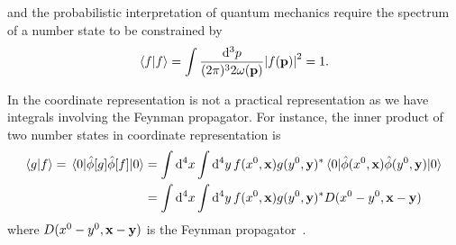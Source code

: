 \begin{corollary}
	 and the probabilistic interpretation of quantum mechanics require the spectrum of a number state to be constrained by
	\begin{equation}
		\bra{f}\ket{f}
		=
		\int\frac{\dd[3]{p}}{(2\pi)^32\omega(\vb{p})}
		\abs{f(\vb{p})}^2
		=
		1
		.
	\end{equation}
\end{corollary}

\begin{remark}
	In the coordinate representation is not a practical representation as we have integrals involving the Feynman propagator.
	For instance, the inner product of two number states in coordinate representation is
	\begin{equation}
		\begin{split}
			\bra{g}\ket{f}
			=
			\expval{\hat\phi[g]\hat\phi[f]}{0}
			&=
			\int\dd[4]{x}
			\int\dd[4]{y}
			f(x^0,\vb{x})g(y^0,\vb{y})^*
			\expval{\hat\phi(x^0,\vb{x})\hat\phi(y^0,\vb{y})}{0}
			\\
			&=
			\int\dd[4]{x}
			\int\dd[4]{y}
			f(x^0,\vb{x})g(y^0,\vb{y})^*
			D(x^0-y^0,\vb{x}-\vb{y})
		\end{split}
	\end{equation}
	where $D(x^0-y^0,\vb{x}-\vb{y})$ is the Feynman propagator~\cite[p.~27]{Peskin1995}.
\end{remark}

